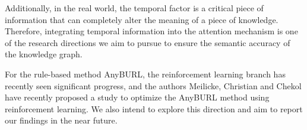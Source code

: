 Additionally, in the real world, the temporal factor is a critical piece of information that can completely alter the meaning of a piece of knowledge. Therefore, integrating temporal information into the attention mechanism is one of the research directions we aim to pursue to ensure the semantic accuracy of the knowledge graph.

For the rule-based method AnyBURL, the reinforcement learning branch has recently seen significant progress, and the authors Meilicke, Christian and Chekol \cite{meilicke2020reinforced} have recently proposed a study to optimize the AnyBURL method using reinforcement learning. We also intend to explore this direction and aim to report our findings in the near future.
